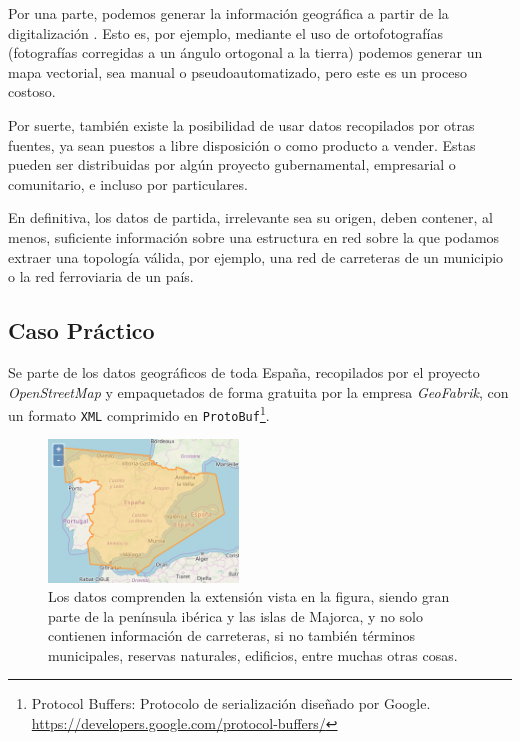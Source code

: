 	Por una parte, podemos generar la información geográfica a partir de la digitalización \autocite[140-152]{bolstad}. Esto es, por ejemplo, mediante el uso de ortofotografías (fotografías corregidas a un ángulo ortogonal a la tierra) podemos generar un mapa vectorial, sea manual o pseudoautomatizado, pero este es un proceso costoso. 
	
	Por suerte, también existe la posibilidad de usar datos recopilados por otras fuentes, ya sean puestos a libre disposición o como producto a vender. Estas pueden ser distribuidas por algún proyecto gubernamental, empresarial o comunitario, e incluso por particulares.
	
	En definitiva, los datos de partida, irrelevante sea su origen, deben contener, al menos, suficiente información sobre una estructura en red sobre la que podamos extraer una topología válida, por ejemplo, una red de carreteras de un municipio o la red ferroviaria de un país.
	
	\subsection*{Caso Práctico}
	Se parte de los datos geográficos de toda España\autocite*{GeofabrikSpa}, recopilados por el proyecto \textit{OpenStreetMap} y empaquetados de forma gratuita por la empresa \textit{GeoFabrik}, con un formato \texttt{XML} comprimido en \texttt{ProtoBuf}\footnote{Protocol Buffers: Protocolo de serialización diseñado por Google. \url{https://developers.google.com/protocol-buffers/}}.
	
	\begin{figure}[htbp]
		\centering
		\includegraphics[width=0.45\textwidth]{img/source_data.png}
		\caption[Extensión de los datos originales]{Los datos comprenden la extensión vista en la figura, siendo gran parte de la península ibérica y las islas de Majorca, y no solo contienen información de carreteras, si no también términos municipales, reservas naturales, edificios, entre muchas otras cosas.}
	\end{figure}
	
